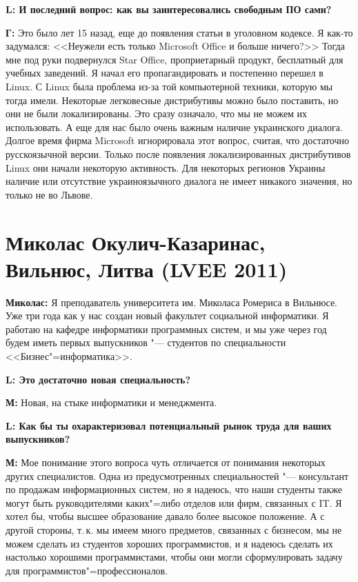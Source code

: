 \documentclass[10pt, a5paper]{article}
\begin{document}
{\noindent \bf L: И последний вопрос: как вы заинтересовались свободным ПО сами?}

{\noindent \bf Г:} Это было лет 15 назад, еще до появления статьи в уголовном кодексе. Я как-то задумался: <<Неужели есть только Microsoft Office и больше ничего?>> Тогда мне под руки подвернулся Star Office, проприетарный продукт, бесплатный для учебных заведений. Я начал его пропагандировать и постепенно перешел в Linux. С Linux была проблема из-за той компьютерной техники, которую мы тогда имели. Некоторые легковесные дистрибутивы можно было поставить, но они не были локализированы. Это сразу означало, что мы не можем их использовать. А еще для нас было очень важным наличие украинского диалога. Долгое время фирма Microsoft игнорировала этот вопрос, считая, что достаточно русскоязычной версии. Только после появления локализированных дистрибутивов Linux они начали некоторую активность. Для некоторых регионов Украины наличие или отсутствие украиноязычного диалога не имеет никакого значения, но только не во Львове.

\section{Миколас Окулич-Казаринас, Вильнюс, Литва (LVEE 2011)}


{\noindent \bf Миколас:} Я преподаватель университета им. Миколаса Ромериса в Вильнюсе. Уже три года как у нас создан новый факультет социальной информатики. Я работаю на кафедре информатики программных систем, и мы уже через год будем иметь первых выпускников "--- студентов по специальности <<Бизнес"=информатика>>.

{\noindent \bf L: Это достаточно новая специальность?}

{\noindent \bf М:} Новая, на стыке информатики и менеджмента. 

{\noindent \bf L: Как бы ты охарактеризовал потенциальный рынок труда для ваших выпускников?}

{\noindent \bf М:} Мое понимание этого вопроса чуть отличается от понимания некоторых других специалистов. Одна из предусмотренных специальностей "--- консультант по продажам информационных систем, но я надеюсь, что наши студенты также могут быть руководителями каких"=либо отделов или фирм, связанных с IT. Я хотел бы, чтобы высшее образование давало более высокое положение. А с другой стороны, т.\,к. мы имеем много предметов, связанных с бизнесом, мы не можем сделать из студентов хороших программистов, и я надеюсь сделать их настолько хорошими программистами, чтобы они могли сформулировать задачу для программистов"=профессионалов.
\end{document}

